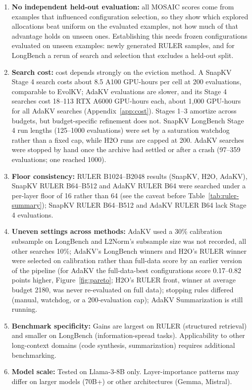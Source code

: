 \documentclass[11pt]{article}
\begin{document}
\begin{enumerate}
\item \textbf{No independent held-out evaluation:} all MOSAIC scores come from examples that influenced configuration selection, so they show which explored allocations beat uniform on the evaluated examples, not how much of that advantage holds on unseen ones. Establishing this needs frozen configurations evaluated on unseen examples: newly generated RULER samples, and for LongBench a rerun of search and selection that excludes a held-out split.
\item \textbf{Search cost:} cost depends strongly on the eviction method. A SnapKV Stage 4 search costs about 8.5 A100 GPU-hours per cell at 200 evaluations, comparable to EvolKV; AdaKV evaluations are slower, and its Stage 4 searches cost 18--113 RTX A6000 GPU-hours each, about 1{,}000 GPU-hours for all AdaKV searches (Appendix~\ref{app:cost}). Stages 1--3 amortize across budgets, but budget-specific refinement does not. SnapKV LongBench Stage 4 run lengths (125--1000 evaluations) were set by a saturation watchdog rather than a fixed cap, while H2O runs are capped at 200. AdaKV searches were stopped by hand once the archive had settled or after a crash (97--359 evaluations; one reached 1000).
\item \textbf{Floor consistency:} RULER B1024--B2048 results (SnapKV, H2O, AdaKV), SnapKV RULER B64--B512 and AdaKV RULER B64 were searched under a per-layer floor of 16 rather than 64 (see the caveat before Table~\ref{tab:ruler-summary}); SnapKV RULER B64--B512 and AdaKV RULER B64 lack Stage 4 evaluations.
\item \textbf{Uneven settings across methods:} AdaKV used a 30\% calibration subsample on LongBench and L2Norm's subsample size was not recorded, all other searches 10\%; AdaKV's LongBench winners and H2O's RULER winner were selected on calibration rather than full-data score by an earlier version of the pipeline (for AdaKV the full-data-best configurations score 0.17--0.82 points higher, Figure~\ref{fig:pareto}; H2O's RULER front, winner at average budget 2180, was never re-evaluated on full data); stopping rules differed (manual, watchdog, or a 200-evaluation cap); AdaKV Summarization is still running.
\item \textbf{Benchmark specificity:} Gains are largest on RULER (structured retrieval) and smaller on LongBench (information-spread tasks). Applicability to other long-context domains (code synthesis, summarization) requires additional benchmarking.
\item \textbf{Model scale:} Tested on Llama-3-8B only. Layer-importance patterns may differ on larger models (70B+) or other architectures (Gemma, Mistral).

\end{enumerate}
\end{document}
